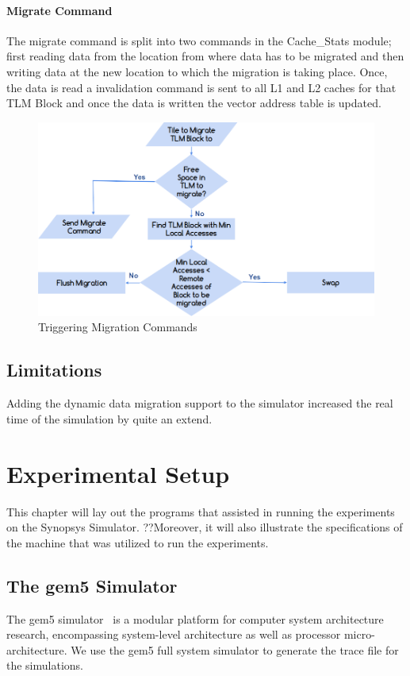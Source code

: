 \documentclass{listhesis}
\begin{document}
\subsubsection{Migrate Command}
The migrate command is split into two commands in the Cache{\_}Stats module; first reading data from the location from where data has to be migrated and then writing data at the new location to which the migration is taking place. Once, the data is read a invalidation command is sent to all L1 and L2 caches for that TLM Block and once the data is written the vector address table is updated.\\
\begin{figure}
  \includegraphics[width=\linewidth]{tlmstats.png}
  \centering
  \caption{Triggering Migration Commands}
  \label{fig:tlm_stats flowchart}
\end{figure}

\section{Limitations}
Adding the dynamic data migration support to the simulator increased the real time of the simulation by quite an extend. 
\chapter{Experimental Setup}
This chapter will lay out the programs that assisted in running the experiments on the Synopsys Simulator. ??Moreover, it will also illustrate the specifications of the machine that was utilized to run the experiments.
\section{The gem5 Simulator}
The gem5 simulator~\cite{gem5} is a modular platform for computer system architecture research, encompassing system-level architecture as well as processor micro-architecture. We use the gem5 full system simulator to generate the trace file for the simulations. 
\end{document}
